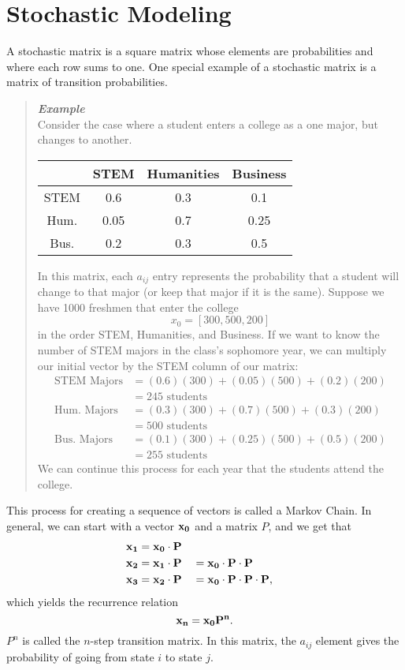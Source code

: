 \documentclass{hw}
\begin{document}
\section*{Stochastic Modeling}

A stochastic matrix is a square matrix whose elements are probabilities and where each row sums to
one. One special example of a stochastic matrix is a matrix of transition probabilities.

\begin{quote}
\textit{\textbf{Example}}\\
Consider the case where a student enters a college as a one major, but changes to another.

\begin{center}
\begin{tabular}{c | c c c}
& STEM & Humanities & Business\\
\hline
STEM & 0.6 & 0.3 & 0.1\\
Hum. & 0.05 & 0.7 & 0.25\\
Bus. & 0.2 & 0.3 & 0.5
\end{tabular}
\end{center}

In this matrix, each $a_{ij}$ entry represents the probability that a student will change to that
major (or keep that major if it is the same). Suppose we have 1000 freshmen that enter the college
\[
x_{0}=[300,500,200]
\]
in the order STEM, Humanities, and Business. If we want to know the number of STEM majors in the
class's sophomore year, we can multiply our initial vector by the STEM column of our matrix:
\begin{align*}
\text{STEM Majors}&=(0.6)(300)+(0.05)(500)+(0.2)(200)\\
&=245\text{ students}\\
\text{Hum. Majors}&=(0.3)(300) + (0.7)(500) + (0.3)(200)\\
&= 500\text{ students}\\
\text{Bus. Majors}&=(0.1)(300) + (0.25)(500) + (0.5)(200)\\
&=255\text{ students}
\end{align*}
We can continue this process for each year that the students attend the college.
\end{quote}

This process for creating a sequence of vectors is called a Markov Chain. In general, we can
start with a vector $\bf{x}_{0}$ and a matrix $P$, and we get that
\begin{alignat*}{3}
\bf{x}_{1}&=\bf{x}_{0}\cdot P\\
\bf{x}_{2}&=\bf{x}_{1}\cdot P &&= \bf{x}_{0}\cdot P\cdot P\\
\bf{x}_{3}&=\bf{x}_{2}\cdot P &&= \bf{x}_{0}\cdot P\cdot P\cdot P,\\
\end{alignat*}
which yields the recurrence relation
\[
\bf{x}_{n}=\bf{x}_{0}P^{n}.
\]
$P^{n}$ is called the $n$-step transition matrix. In this matrix, the $a_{ij}$ element gives the
probability of going from state $i$ to state $j$.
\end{document}
